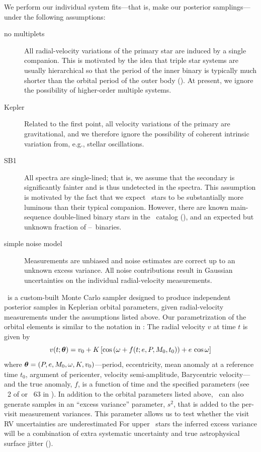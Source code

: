 \documentclass[modern, letterpaper]{aastex62}
\newcommand{\apogee}{\project{\acronym{APOGEE}}}
\newcommand{\thejoker}{\project{The~Joker}}
\newcommand{\RGB}{\acronym{RGB}}
\begin{document}
We perform our individual system fits---that is, make our posterior
samplings---under the following assumptions:
\begin{description}
\item[no multiplets] All radial-velocity variations of the primary star are
  induced by a single companion.
  This is motivated by the idea that triple star systems are usually
  hierarchical so that the period of the inner binary is typically much shorter
  than the orbital period of the outer body ().
  At present, we ignore the possibility of higher-order multiple systems.
\item[Kepler] Related to the first point, all velocity variations of the primary
  are gravitational, and we therefore ignore the possibility of coherent intrinsic variation from, e.g., stellar oscillations.
\item[SB1] All spectra are single-lined; that is, we assume that the secondary
  is significantly fainter and is thus undetected in the spectra.
  This assumption is motivated by the fact that we expect \RGB\ stars to be
  substantially more luminous than their typical companion.
  However, there are known main-sequence double-lined binary stars in the
  \apogee\ catalog (\citealt{El-Badry:2018}), and an expected but unknown
  fraction of \RGB--\RGB\ binaries.
\item[simple noise model] Measurements are unbiased and noise estimates are
  correct up to an unknown excess variance.
  All noise contributions result in Gaussian uncertainties on the individual
  radial-velocity measurements.
\end{description}

\thejoker\ is a custom-built Monte Carlo sampler designed to produce independent
posterior samples in Keplerian orbital parameters, given radial-velocity
measurements under the assumptions listed above.
Our parametrization of the orbital elements is similar to the notation in
\citet{Murray:2010}:
The radial velocity $v$ at time $t$ is given by
\begin{equation}
  v(t;\bs{\theta}) = v_0 + K\,[\cos\left(\omega + f(t; e, P, M_0, t_0)\right) +
    e\,\cos\omega]
\end{equation}
where $\boldsymbol{\theta} = (P,e,M_0,\omega,K,v_0)$---period, eccentricity, mean
anomaly at a reference time $t_0$, argument of pericenter, velocity
semi-amplitude, Barycentric velocity---and the true anomaly, $f$, is a function
of time and the specified parameters (see \sectionname~2 of
\citealt{Price-Whelan:2017} or \eqname~63 in \citealt{Murray:2010}).
In addition to the orbital parameters listed above, \thejoker\ can also generate
samples in an ``excess variance'' parameter, $s^2$, that is added to the
per-visit measurement variances.
This parameter allows us to test whether the visit RV uncertainties are
underestimated
For upper \RGB\ stars the inferred excess variance will be a combination of
extra systematic uncertainty and true astrophysical surface jitter
().
\end{document}
